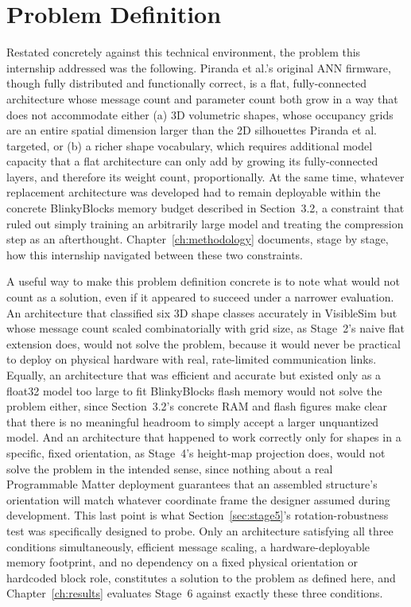 \documentclass[12pt,a4paper]{report}
\begin{document}
\section{Problem Definition}

Restated concretely against this technical environment, the problem this internship addressed was the following. Piranda et al.'s original ANN firmware, though fully distributed and functionally correct, is a flat, fully-connected architecture whose message count and parameter count both grow in a way that does not accommodate either (a) 3D volumetric shapes, whose occupancy grids are an entire spatial dimension larger than the 2D silhouettes Piranda et al. targeted, or (b) a richer shape vocabulary, which requires additional model capacity that a flat architecture can only add by growing its fully-connected layers, and therefore its weight count, proportionally. At the same time, whatever replacement architecture was developed had to remain deployable within the concrete BlinkyBlocks memory budget described in Section~3.2, a constraint that ruled out simply training an arbitrarily large model and treating the compression step as an afterthought. Chapter~\ref{ch:methodology} documents, stage by stage, how this internship navigated between these two constraints.

A useful way to make this problem definition concrete is to note what would not count as a solution, even if it appeared to succeed under a narrower evaluation. An architecture that classified six 3D shape classes accurately in VisibleSim but whose message count scaled combinatorially with grid size, as Stage~2's naive flat extension does, would not solve the problem, because it would never be practical to deploy on physical hardware with real, rate-limited communication links. Equally, an architecture that was efficient and accurate but existed only as a float32 model too large to fit BlinkyBlocks flash memory would not solve the problem either, since Section~3.2's concrete RAM and flash figures make clear that there is no meaningful headroom to simply accept a larger unquantized model. And an architecture that happened to work correctly only for shapes in a specific, fixed orientation, as Stage~4's height-map projection does, would not solve the problem in the intended sense, since nothing about a real Programmable Matter deployment guarantees that an assembled structure's orientation will match whatever coordinate frame the designer assumed during development. This last point is what Section~\ref{sec:stage5}'s rotation-robustness test was specifically designed to probe. Only an architecture satisfying all three conditions simultaneously, efficient message scaling, a hardware-deployable memory footprint, and no dependency on a fixed physical orientation or hardcoded block role, constitutes a solution to the problem as defined here, and Chapter~\ref{ch:results} evaluates Stage~6 against exactly these three conditions.
\end{document}
